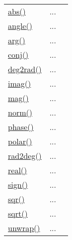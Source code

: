 \textcolor{blue}{}\begin{tabular}{>{\raggedleft}p{3cm}>{\centering}p{0.5cm}l}
\textcolor{blue}{\hyperlink{abs}{abs()}}&
...&
 \begin{NoHyper} \nameref{par:Absolute-value} \end{NoHyper}\tabularnewline
\textcolor{blue}{\hyperlink{angle}{angle()}}&
...&
 \begin{NoHyper} \nameref{par:angle} \end{NoHyper}\tabularnewline
\textcolor{blue}{\hyperlink{arg}{arg()}}&
...&
 \begin{NoHyper} \nameref{par:arg} \end{NoHyper}\tabularnewline
\textcolor{blue}{\hyperlink{conj}{conj()}}&
...&
 \begin{NoHyper} \nameref{par:Conjugate} \end{NoHyper}\tabularnewline
\textcolor{blue}{\hyperlink{deg2rad}{deg2rad()}}&
...&
 \begin{NoHyper} \nameref{par:deg2rad} \end{NoHyper}\tabularnewline
\textcolor{blue}{\hyperlink{imag}{imag()}}&
...&
 \begin{NoHyper} \nameref{par:Imag} \end{NoHyper}\tabularnewline
\textcolor{blue}{\hyperlink{mag}{mag()}}&
...&
 \begin{NoHyper} \nameref{par:Magnitude} \end{NoHyper}\tabularnewline
\textcolor{blue}{\hyperlink{norm}{norm()}}&
...&
 \begin{NoHyper} \nameref{par:norm} \end{NoHyper}\tabularnewline
\textcolor{blue}{\hyperlink{phase}{phase()}}&
...&
 \begin{NoHyper} \nameref{par:Phase} \end{NoHyper}\tabularnewline
\textcolor{blue}{\hyperlink{polar}{polar()}}&
...&
 \begin{NoHyper} \nameref{par:polar} \end{NoHyper}\tabularnewline
\textcolor{blue}{\hyperlink{rad2deg}{rad2deg()}}&
...&
 \begin{NoHyper} \nameref{par:rad2deg} \end{NoHyper}\tabularnewline
\textcolor{blue}{\hyperlink{real}{real()}}&
...&
 \begin{NoHyper} \nameref{par:Real} \end{NoHyper}\tabularnewline
\textcolor{blue}{\hyperlink{sign}{sign()}}&
...&
 \begin{NoHyper} \nameref{par:Signum} \end{NoHyper}\tabularnewline
\textcolor{blue}{\hyperlink{sqr}{sqr()}}&
...&
 \begin{NoHyper} \nameref{par:Square} \end{NoHyper}\tabularnewline
\textcolor{blue}{\hyperlink{sqrt}{sqrt()}}&
...&
 \begin{NoHyper} \nameref{par:Square-root} \end{NoHyper}\tabularnewline
\textcolor{blue}{\hyperlink{unwrap}{unwrap()}}&
...&
 \begin{NoHyper} \nameref{par:Unwrap} \end{NoHyper}\tabularnewline
\end{tabular}


